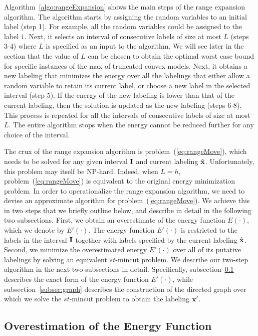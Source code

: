 \documentclass[10pt,letterpaper]{article}
\begin{document}
Algorithm~\ref{algo:rangeExpansion} shows the main steps of the range expansion algorithm. The algorithm starts by assigning
the random variables to an initial label (step 1). For example, all the random variables could be assigned to the label $1$. 
Next, it selects an interval of consecutive labels of size at most $L$ (steps 3-4) where $L$ is specified as an input to the
algorithm. We will see later in the section that the value of $L$ can be chosen to obtain the optimal worst case bound for specific instances of
the max of truncated convex models. Next, it obtains a new labeling that minimizes the energy over all the labelings that either allow a random
variable to retain its current label, or choose a new label in the selected interval (step 5). If the energy of the new labeling is lower than
that of the current labeling, then the solution is updated as the new labeling (steps 6-8). This process is repeated for all the intervals
of consecutive labels of size at most $L$. The entire algorithm stops when the energy cannot be reduced further for any choice of the interval.

The crux of the range expansion algorithm is problem~(\ref{eq:rangeMove}), which needs to be solved for any given interval ${\bf I}$ and
current labeling $\hat{\bf x}$. Unfortunately, this problem may itself be NP-hard. Indeed, when $L = h$, problem~(\ref{eq:rangeMove}) is
equivalent to the original energy minimization problem. In order to operationalize the range expansion algorithm, we need to devise an
approximate algorithm for problem~(\ref{eq:rangeMove}). We achieve this in two steps that we briefly outline below, and describe in
detail in the following two subsections. First, we obtain an overestimate of the energy
function $E(\cdot)$, which we denote by $E'(\cdot)$.
The energy function $E'(\cdot)$ is restricted to the labels in the interval ${\bf I}$ together with labels specified by
the current labeling $\hat{\bf x}$. Second, we minimize the overestimated energy $E'(\cdot)$ over all of its putative
labelings by solving an equivalent $st$-{\sc mincut} problem.
We describe our two-step algorithm in the next two subsections in detail. Specifically, subsection~\ref{subsec:overestimate} describes the
exact form of the energy function $E'(\cdot)$, while subsection~\ref{subsec:graph} describes the construction of the
directed graph over which we solve the $st$-{\sc mincut} problem to obtain the labeling ${\bf x}'$.

\subsection{Overestimation of the Energy Function}
\label{subsec:overestimate}
\end{document}
